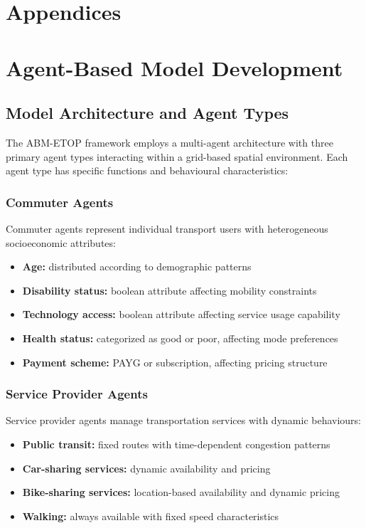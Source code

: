 \appendix
\section*{Appendices}
\renewcommand{\thesection}{A\arabic{section}}
\setcounter{section}{0}

\section{Agent-Based Model Development}
\label{app:abm_development}

\subsection{Model Architecture and Agent Types}
The ABM-ETOP framework employs a multi-agent architecture with three primary agent types interacting within a grid-based spatial environment. Each agent type has specific functions and behavioural characteristics:

\subsubsection{Commuter Agents}
Commuter agents represent individual transport users with heterogeneous socioeconomic attributes:
\begin{itemize}
    \item \textbf{Age:} distributed according to demographic patterns
    \item \textbf{Disability status:} boolean attribute affecting mobility constraints
    \item \textbf{Technology access:} boolean attribute affecting service usage capability
    \item \textbf{Health status:} categorized as good or poor, affecting mode preferences
    \item \textbf{Payment scheme:} PAYG or subscription, affecting pricing structure
\end{itemize}

\subsubsection{Service Provider Agents}
Service provider agents manage transportation services with dynamic behaviours:
\begin{itemize}
    \item \textbf{Public transit:} fixed routes with time-dependent congestion patterns
    \item \textbf{Car-sharing services:} dynamic availability and pricing
    \item \textbf{Bike-sharing services:} location-based availability and dynamic pricing
    \item \textbf{Walking:} always available with fixed speed characteristics
\end{itemize}

